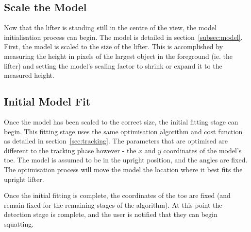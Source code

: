 \subsection{Scale the Model}
Now that the lifter is standing still in the centre of the view, the model initialisation process can begin. The model is detailed in section~\ref{subsec:model}. First, the model is scaled to the size of the lifter. This is accomplished by measuring the height in pixels of the largest object in the foreground (ie. the lifter) and setting the model's scaling factor to shrink or expand it to the measured height.

\subsection{Initial Model Fit}
Once the model has been scaled to the correct size, the initial fitting stage can begin. This fitting stage uses the same optimisation algorithm and cost function as detailed in section~\ref{sec:tracking}. The parameters that are optimised are different to the tracking phase however - the $x$ and $y$ coordinates of the model's toe. The model is assumed to be in the upright position, and the angles are fixed. The optimisation process will move the model the location where it best fits the upright lifter.

Once the initial fitting is complete, the coordinates of the toe are fixed (and remain fixed for the remaining stages of the algorithm). At this point the detection stage is complete, and the user is notified that they can begin squatting.